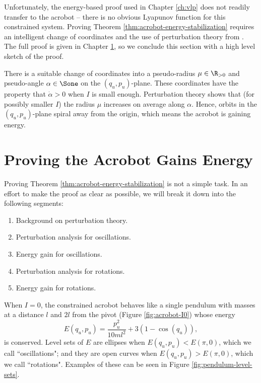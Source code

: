 Unfortunately, the energy-based proof used in Chapter \ref{ch:vlp} does not
readily transfer to the acrobot -- there is no obvious Lyapunov function for
this constrained system.
Proving Theorem \ref{thm:acrobot-energy-stabilization} requires an intelligent
change of coordinates and the use of perturbation theory from
\cite{khalil_nonlinear}.
The full proof is given in Chapter \ref{sec:acrobot-proof}, so 
we conclude this section with a high level sketch of the proof.

There is a suitable change of coordinates into a pseudo-radius 
\(\mu \in \R_{>0}\) and pseudo-angle \(\alpha \in \Sone\) on the
\((q_u,p_u)\)-plane.
These coordinates have the property that \(\dot{\alpha} > 0\) when
\(I\) is small enough.
Perturbation theory shows that (for possibly smaller \(I\)) the radius \(\mu\)
increases on average along \(\alpha\).
Hence, orbits in the \((q_u,p_u)\)-plane spiral away from the origin, 
which means the acrobot is gaining energy.
 
\section{Proving the Acrobot Gains Energy}\label{sec:acrobot-proof}
Proving Theorem \ref{thm:acrobot-energy-stabilization} is not a simple task.
In an effort to make the proof as clear as possible, we will break it down into
the following segments:
\begin{enumerate}
    \item Background on perturbation theory.
    \item Perturbation analysis for oscillations.
    \item Energy gain for oscillations.
    \item Perturbation analysis for rotations.
    \item Energy gain for rotations.
\end{enumerate}

When \(I = 0\), the constrained acrobot behaves like a single
pendulum with masses at a distance \(l\) and \(2l\) from the pivot 
(Figure \ref{fig:acrobot-I0}) whose energy
\begin{equation}\label{eqn:acrobot-nominal-E}
    E(q_u,p_u) = \frac{p_u^2}{10ml^2} + 3(1 - \cos(q_u))
    ,
\end{equation}
is conserved.
Level sets of \(E\) are ellipses when \(E(q_u,p_u) < E(\pi,0)\), which we call
``oscillations"; and they are open curves when \(E(q_u,p_u) > E(\pi,0)\), which we call
``rotations". 
Examples of these can be seen in Figure \ref{fig:pendulum-level-sets}.

